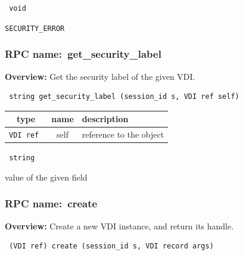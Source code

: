 \vspace{0.3cm}

{\tt
void
}


\vspace{0.3cm}

 {\tt SECURITY\_ERROR}

\vspace{0.3cm}
\vspace{0.3cm}
\vspace{0.3cm}
\subsubsection{RPC name:~get\_security\_label}

{\bf Overview:}
Get the security label of the given VDI.

\begin{verbatim} string get_security_label (session_id s, VDI ref self)\end{verbatim}





\vspace{0.3cm}
\begin{tabular}{|c|c|p{7cm}|}
 \hline
{\bf type} & {\bf name} & {\bf description} \\ \hline
{\tt VDI ref } & self & reference to the object \\ \hline

\end{tabular}

\vspace{0.3cm}

{\tt
string
}


value of the given field
\vspace{0.3cm}
\vspace{0.3cm}
\vspace{0.3cm}
\subsubsection{RPC name:~create}

{\bf Overview:} 
Create a new VDI instance, and return its handle.

\begin{verbatim} (VDI ref) create (session_id s, VDI record args)\end{verbatim}


